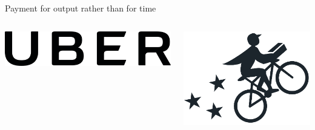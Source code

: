 \documentclass[presentation]{subfiles}
\begin{document}
\begin{frame}[t]{Payment for output rather than for time}
{\begin{columns}[b]
\begin{column}[t]{0.45\textwidth}
        \begin{columns}
          \begin{column}{.5\textwidth}
            \includegraphics[max width=\linewidth,max height=\textheight,keepaspectratio]{../common_figures/uber.png}
          \end{column}
          \begin{column}{.5\textwidth}
            \includegraphics[max width=\linewidth,max height=\textheight,keepaspectratio]{../common_figures/postmates.png}
          \end{column}
        \end{columns}
      \end{column}
    \end{columns}
  }
\end{frame}


\begin{frame} %

      \centering
        
\end{frame}
\end{document}
